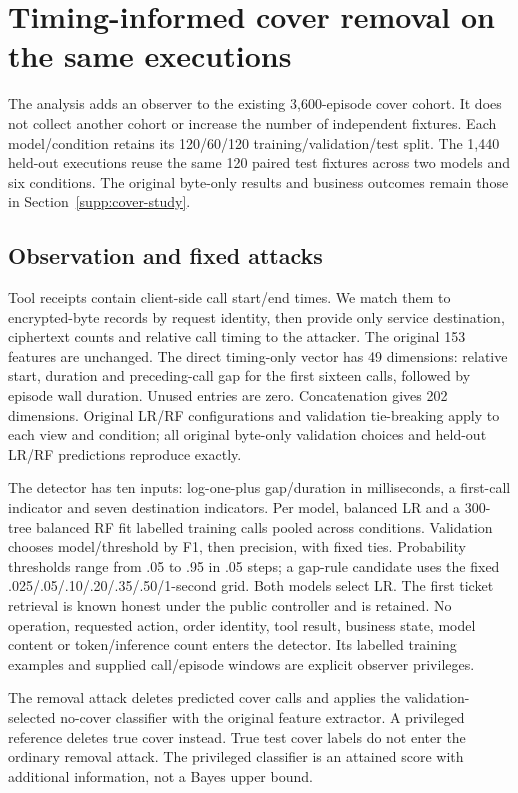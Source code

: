 \section{Timing-informed cover removal on the same executions}\label{supp:b1-timing}
The analysis adds an observer to the existing 3,600-episode cover cohort. It does not collect another cohort or increase the number of independent fixtures. Each model/condition retains its 120/60/120 training/validation/test split. The 1,440 held-out executions reuse the same 120 paired test fixtures across two models and six conditions. The original byte-only results and business outcomes remain those in Section~\ref{supp:cover-study}.

\subsection{Observation and fixed attacks}
Tool receipts contain client-side call start/end times. We match them to encrypted-byte records by request identity, then provide only service destination, ciphertext counts and relative call timing to the attacker. The original 153 features are unchanged. The direct timing-only vector has 49 dimensions: relative start, duration and preceding-call gap for the first sixteen calls, followed by episode wall duration. Unused entries are zero. Concatenation gives 202 dimensions. Original LR/RF configurations and validation tie-breaking apply to each view and condition; all original byte-only validation choices and held-out LR/RF predictions reproduce exactly.

The detector has ten inputs: log-one-plus gap/duration in milliseconds, a first-call indicator and seven destination indicators. Per model, balanced LR and a 300-tree balanced RF fit labelled training calls pooled across conditions. Validation chooses model/threshold by F1, then precision, with fixed ties. Probability thresholds range from .05 to .95 in .05 steps; a gap-rule candidate uses the fixed .025/.05/.10/.20/.35/.50/1-second grid. Both models select LR. The first ticket retrieval is known honest under the public controller and is retained. No operation, requested action, order identity, tool result, business state, model content or token/inference count enters the detector. Its labelled training examples and supplied call/episode windows are explicit observer privileges.

The removal attack deletes predicted cover calls and applies the validation-selected no-cover classifier with the original feature extractor. A privileged reference deletes true cover instead. True test cover labels do not enter the ordinary removal attack. The privileged classifier is an attained score with additional information, not a Bayes upper bound.

